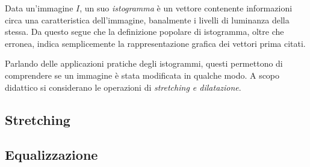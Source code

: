 \documentclass{subfiles}
\begin{document}
Data un'immagine \(I\), un suo \emph{istogramma} è un vettore contenente informazioni circa una caratteristica dell'immagine,
banalmente i livelli di luminanza della stessa. Da questo segue che la definizione popolare di istogramma, oltre che erronea,
indica semplicemente la rappresentazione grafica dei vettori prima citati.

Parlando delle applicazioni pratiche degli istogrammi, questi permettono di comprendere se un immagine è stata modificata in qualche modo.
A scopo didattico si considerano le operazioni di \emph{stretching \emph{e} dilatazione}.

\subsection{Stretching}


\subsection{Equalizzazione}

\end{document}
